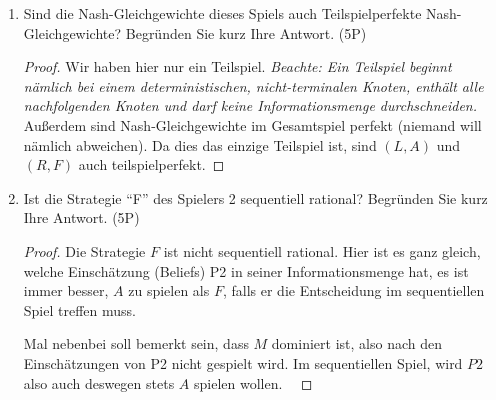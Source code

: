 \documentclass[12pt]{article}
\begin{document}
\begin{enumerate}[label=\alph*\upshape)]
\begin{proof}
			\textit{Hier bin ich mir nicht sicher, ob man nur in reinen Strategien untersuchen sollte.} Tipp: die Suche nach Nash-Gleichgewichten in gemischten Strategien für drei Strategien ist schwierig und dauert lang. Oft Mals kann man allerdings eine der drei Strategien vorab ausschließen. ~\smallskip
			
			Da hier $M$ strikt dominiert durch $R$ ist, folgt analog wie in Aufgabe 1, dass $M$ in keinem Gleichgewicht vorkommen kann. Angenommmen P1 spielt mit Wahrscheinlichkeit $p \in (0, 1)$ die Strategie $L$ und mit $(1-p)$ die Strategie $R$. Für ein Nash-Gleichgewicht müsste der erwartete Nutzen für P2 ausgeglichen sein, d.h.
			\begin{align*}
				\mathbb{E}[u(A)] & \overset{!}{=} \mathbb{E}[u(F)] \\
				\iff 1 \cdot p +  3 \cdot (1-p) & = 0 \cdot p + 3 \cdot (1-p) \iff p = 0,
			\end{align*}
			was einen Widerspruch darstellt. Es existiert also kein Nash-Gleichgewicht in (echt) gemischten Strategien und $(L,A)$ und $(R, F)$ sind damit die einzigen Gleichgewichte. ~\smallskip
			
			\textit{Auch hier gab es wieder ein kurzes Argument: da nämlich dass $A$ die Strategie $F$ schwach dominiert. Würde P1 eine echte Mischung auf $L$ und $R$ spielen, wird P2 stets $A$ wählen wollen, worauf $P1$ allerdings lieber rein $L$ spielt. Das heißt es kann kein Gleichgewicht in gemischten Strategien geben. Falls dies nicht ganz klar ist, einfach wie oben kurz per Hand nachrechnen.}
		\end{proof}
	\item Sind die Nash-Gleichgewichte dieses Spiels auch Teilspielperfekte Nash-Gleichgewichte? Begründen Sie kurz Ihre Antwort. (5P)
		\begin{proof}
			Wir haben hier nur ein Teilspiel. \textit{Beachte: Ein Teilspiel beginnt nämlich bei einem deterministischen, nicht-terminalen Knoten, enthält alle nachfolgenden Knoten und darf keine Informationsmenge durchschneiden.} Außerdem sind Nash-Gleichgewichte im Gesamtspiel perfekt (niemand will nämlich abweichen). Da dies das einzige Teilspiel ist, sind $(L,A)$ und $(R, F)$ auch teilspielperfekt. 
		\end{proof}
	\item Ist die Strategie \enquote{F} des Spielers 2 sequentiell rational? Begründen Sie kurz Ihre Antwort. (5P)
		\begin{proof}
			Die Strategie $F$ ist nicht sequentiell rational. Hier ist es ganz gleich, welche Einschätzung (Beliefs) P2 in seiner Informationsmenge hat, es ist immer besser, $A$ zu spielen als $F$, falls er die Entscheidung im sequentiellen Spiel treffen muss. ~\smallskip
			
			Mal nebenbei soll bemerkt sein, dass $M$ dominiert ist, also nach den Einschätzungen von P2 nicht gespielt wird. Im sequentiellen Spiel, wird $P2$ also auch deswegen stets $A$ spielen wollen. ~\smallskip
		\end{proof}
\end{enumerate}
\end{document}
